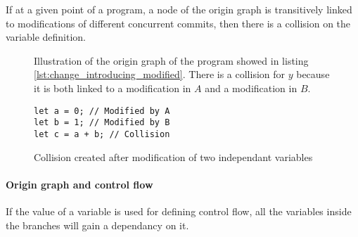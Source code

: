 \documentclass[a4paper,10pt]{article}
\begin{document}
If at a given point of a program, a node of the origin graph is transitively linked to modifications of different concurrent commits, then there is a collision on the variable definition.

\begin{figure}[ht]
\centering{}
\caption{Illustration of the origin graph of the program showed in listing \ref{lst:change_introducing_modified}. There is a collision for $y$ because it is both linked to a modification in $A$ and a modification in $B$.}
\label{fig:change_introducing_modified}
\end{figure}

\begin{figure}[ht]
\begin{minipage}{.5\textwidth}
\begin{lstlisting}
let a = 0; // Modified by A
let b = 1; // Modified by B
let c = a + b; // Collision
\end{lstlisting}
\end{minipage}\hfill
\begin{minipage}{.45\textwidth}
\centering{}
\end{minipage}
\caption{Collision created after modification of two independant variables}
\end{figure}
\FloatBarrier

\paragraph{Origin graph and control flow} If the value of a variable is used for defining control flow, all the variables inside the branches will gain a dependancy on it.
\end{document}
